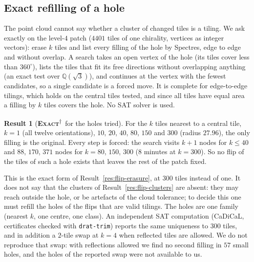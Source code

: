 \documentclass[11pt]{article}
\newcommand{\exact}{\textbf{\textsc{Exact}}}
\newcommand{\snap}{\textsuperscript{$\dagger$}}      %
\theoremstyle{definition}
\newtheorem{result}{Result}
\begin{document}
\subsection{Exact refilling of a hole}\label{sec:flips-cavity}
The point cloud cannot say whether a cluster of changed tiles is a tiling. We ask exactly on the level-$4$ patch ($4401$ tiles of one chirality, vertices as integer vectors): erase $k$ tiles and list every filling of the hole by Spectres, edge to edge and without overlap. A search takes an open vertex of the hole (its tiles cover less than $360^\circ$), lists the tiles that fit its free directions without overlapping anything (an exact test over $\mathbb{Q}(\sqrt3)$), and continues at the vertex with the fewest candidates, so a single candidate is a forced move. It is complete for edge-to-edge tilings, which holds on the central tiles tested, and since all tiles have equal area a filling by $k$ tiles covers the hole. No SAT solver is used.
\begin{result}[\exact\snap\ for the holes tried]\label{res:flip-cavity}
For the $k$ tiles nearest to a central tile, $k=1$ (all twelve orientations), $10$, $20$, $40$, $80$, $150$ and $300$ (radius $27.96$), the only filling is the original. Every step is forced: the search visits $k+1$ nodes for $k\le40$ and $88$, $170$, $371$ nodes for $k=80$, $150$, $300$ ($8$ minutes at $k=300$). So no flip of the tiles of such a hole exists that leaves the rest of the patch fixed.
\end{result}
This is the exact form of Result~\ref{res:flip-erasure}, at $300$ tiles instead of one. It does not say that the clusters of Result~\ref{res:flip-clusters} are absent: they may reach outside the hole, or be artefacts of the cloud tolerance; to decide this one must refill the holes of the flips that are valid tilings. The holes are one family (nearest $k$, one centre, one class). An independent SAT computation (CaDiCaL, certificates checked with \texttt{drat-trim}) reports the same uniqueness to $300$ tiles, and in addition a $2$-tile swap at $k=4$ when reflected tiles are allowed. We do not reproduce that swap: with reflections allowed we find no second filling in $57$ small holes, and the holes of the reported swap were not available to us.
\end{document}
